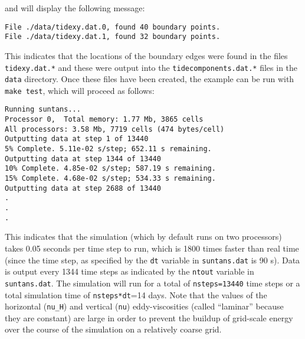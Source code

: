 and will display the following message:
\begin{verbatim}
File ./data/tidexy.dat.0, found 40 boundary points.
File ./data/tidexy.dat.1, found 32 boundary points.
\end{verbatim}
This indicates that the locations of the boundary edges were found in the files \verb+tidexy.dat.*+ and these
were output into the \verb+tidecomponents.dat.*+ files in the \verb+data+ directory.
Once these files have been created, the example can be run with \verb+make test+, which will proceed as
follows:
\begin{verbatim}
Running suntans...
Processor 0,  Total memory: 1.77 Mb, 3865 cells
All processors: 3.58 Mb, 7719 cells (474 bytes/cell)
Outputting data at step 1 of 13440
5% Complete. 5.11e-02 s/step; 652.11 s remaining.
Outputting data at step 1344 of 13440
10% Complete. 4.85e-02 s/step; 587.19 s remaining.
15% Complete. 4.68e-02 s/step; 534.33 s remaining.
Outputting data at step 2688 of 13440
.
.
.
\end{verbatim}
This indicates that the simulation (which by default runs on two processors) takes 0.05 seconds per
time step to run, which is 1800 times faster than real time (since the time step, as specified by
the \verb+dt+ variable in \verb+suntans.dat+ is 90 s).  Data is output every 1344 time steps as
indicated by the \verb+ntout+ variable in \verb+suntans.dat+.  The simulation will run for a total
of \verb+nsteps=13440+ time steps or a total simulation time of \verb+nsteps*dt+=14 days.  Note
that the values of the horizontal (\verb+nu_H+) and vertical (\verb+nu+) eddy-viscosities (called ``laminar'' because they
are constant) are large in order to prevent the buildup of grid-scale energy over the course of
the simulation on a relatively coarse grid.

